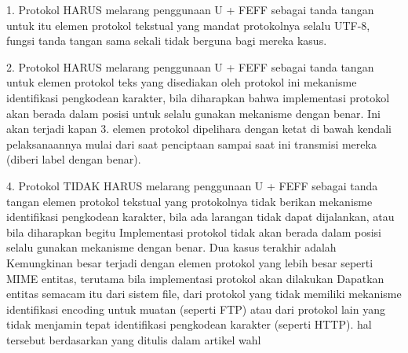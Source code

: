     1. Protokol HARUS melarang penggunaan U + FEFF sebagai tanda tangan untuk itu
      elemen protokol tekstual yang mandat protokolnya selalu
      UTF-8, fungsi tanda tangan sama sekali tidak berguna bagi mereka
      kasus.

    2. Protokol HARUS melarang penggunaan U + FEFF sebagai tanda tangan untuk
      elemen protokol teks yang disediakan oleh protokol ini
      mekanisme identifikasi pengkodean karakter, bila diharapkan
      bahwa implementasi protokol akan berada dalam posisi untuk
      selalu gunakan mekanisme dengan benar. Ini akan terjadi kapan
	  3. elemen protokol dipelihara dengan ketat di bawah kendali
      pelaksanaannya mulai dari saat penciptaan sampai saat ini
      transmisi mereka (diberi label dengan benar).

    4. Protokol TIDAK HARUS melarang penggunaan U + FEFF sebagai tanda tangan
      elemen protokol tekstual yang protokolnya tidak
      berikan mekanisme identifikasi pengkodean karakter, bila ada larangan
      tidak dapat dijalankan, atau bila diharapkan begitu
      Implementasi protokol tidak akan berada dalam posisi
      selalu gunakan mekanisme dengan benar. Dua kasus terakhir adalah
      Kemungkinan besar terjadi dengan elemen protokol yang lebih besar seperti MIME
      entitas, terutama bila implementasi protokol akan dilakukan
      Dapatkan entitas semacam itu dari sistem file, dari protokol yang tidak
      memiliki mekanisme identifikasi encoding untuk muatan (seperti FTP)
      atau dari protokol lain yang tidak menjamin tepat
      identifikasi pengkodean karakter (seperti HTTP).
     hal tersebut berdasarkan yang ditulis dalam artikel wahl \cite{wahl1997lightweight}